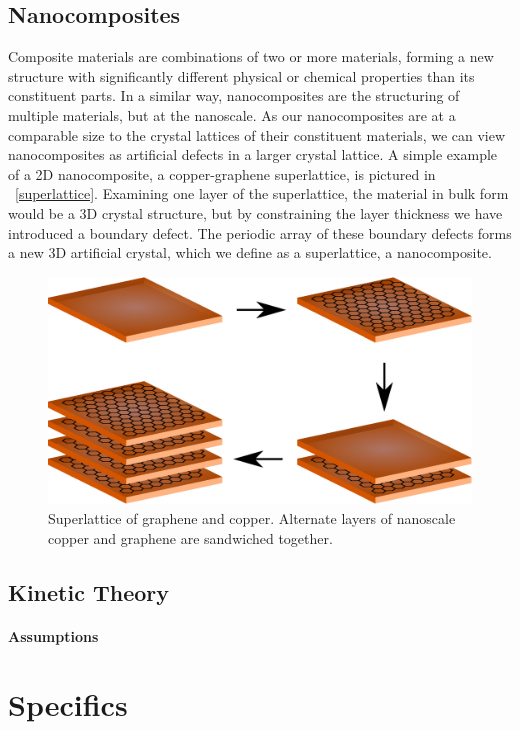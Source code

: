 \documentclass[12pt,titlepage,draft]{article}
\newcommand{\figref}[2][\figurename~]{#1\ref{#2}}
\begin{document}
\subsection{Nanocomposites}
Composite materials are combinations of two or more materials, forming a new structure with significantly different physical or chemical properties than its constituent parts. In a similar way, nanocomposites are the structuring of multiple materials, but at the nanoscale. As our nanocomposites are at a comparable size to the crystal lattices of their constituent materials, we can view nanocomposites as artificial defects in a larger crystal lattice. A simple example of a 2D nanocomposite, a copper-graphene superlattice, is pictured in \figref{superlattice}. Examining one layer of the superlattice, the material in bulk form would be a 3D crystal structure, but by constraining the layer thickness we have introduced a boundary defect. The periodic array of these boundary defects forms a new 3D artificial crystal, which we define as a superlattice, a nanocomposite.

\begin{figure}
	\label{fig:superlattice}
	\centering
	\includegraphics[width=\textwidth]{graphene-superlattice.eps}
	\caption{Superlattice of graphene and copper. Alternate layers of nanoscale copper and graphene are sandwiched together.}
\end{figure}

\subsection{Kinetic Theory}
\paragraph{Assumptions}

\section{Specifics}
\end{document}
